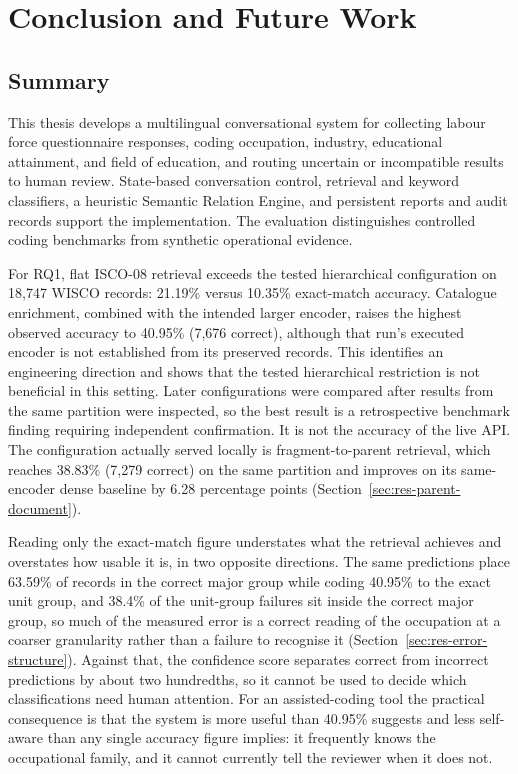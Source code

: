 \chapter{Conclusion and Future Work}
\label{chap:conclusion}

\section{Summary}
\label{sec:conc-summary}

This thesis develops a multilingual conversational system for collecting
labour force questionnaire responses, coding occupation, industry,
educational attainment, and field of education, and routing uncertain or
incompatible results to human review. State-based conversation control,
retrieval and keyword classifiers, a heuristic Semantic Relation Engine,
and persistent reports and audit records support the implementation.
The evaluation distinguishes controlled coding benchmarks from synthetic
operational evidence.

For RQ1, flat ISCO-08 retrieval exceeds the tested hierarchical
configuration on 18,747 WISCO records: 21.19\% versus 10.35\% exact-match
accuracy. Catalogue enrichment, combined with the intended larger encoder,
raises the highest observed accuracy to 40.95\% (7,676 correct), although
that run's executed encoder is not established from its preserved records.
This identifies an engineering direction and shows that the tested
hierarchical restriction is not beneficial in this setting. Later
configurations were compared after results from the same partition were
inspected, so the best result is a retrospective benchmark finding
requiring independent confirmation. It is not the accuracy of the live
API. The configuration actually served locally is fragment-to-parent
retrieval, which reaches 38.83\% (7,279 correct) on the same partition and
improves on its same-encoder dense baseline by 6.28 percentage points
(Section~\ref{sec:res-parent-document}).

Reading only the exact-match figure understates what the retrieval
achieves and overstates how usable it is, in two opposite directions. The
same predictions place 63.59\% of records in the correct major group while
coding 40.95\% to the exact unit group, and 38.4\% of the unit-group
failures sit inside the correct major group, so much of the measured error
is a correct reading of the occupation at a coarser granularity rather
than a failure to recognise it
(Section~\ref{sec:res-error-structure}). Against that, the confidence
score separates correct from incorrect predictions by about two
hundredths, so it cannot be used to decide which classifications need
human attention. For an assisted-coding tool the practical consequence is
that the system is more useful than 40.95\% suggests and less
self-aware than any single accuracy figure implies: it frequently knows
the occupational family, and it cannot currently tell the reviewer when it
does not.

